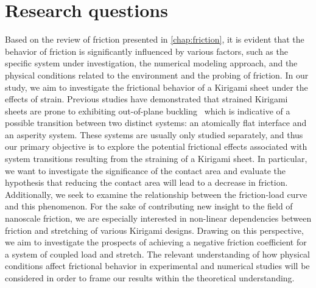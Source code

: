 



\section{Research questions}\label{sec:research_questions}

%
%
%
%
%


Based on the review of friction presented in \cref{chap:friction}, it is evident that the behavior of friction is significantly influenced by various factors, such as the specific system under investigation, the numerical modeling approach, and the physical conditions related to the environment and the probing of friction. In our study, we aim to investigate the frictional behavior
of a Kirigami sheet under the effects of strain. Previous studies have
demonstrated that strained Kirigami sheets are prone to exhibiting out-of-plane buckling~\cite{PhysRevLett.121.255304, PhysRevResearch.2.042006} which is indicative of a possible transition between two distinct systems: an atomically flat interface and an asperity system. These systems are usually only studied
separately, and thus our primary objective is to explore the potential frictional effects associated with system transitions resulting from the straining of a Kirigami sheet. In particular, we want to investigate the significance of the contact area and evaluate the hypothesis that reducing the contact area will lead to a decrease in friction. Additionally, we seek to examine the relationship between the friction-load curve and this phenomenon. For the sake of contributing new insight to the field of nanoscale
friction, we are especially interested in non-linear dependencies between
friction and stretching of various Kirigami designs. Drawing on this
perspective, we aim to investigate the prospects of achieving a negative friction coefficient for a system of coupled load and stretch. The relevant
understanding of how physical conditions affect frictional behavior in
experimental and numerical studies will be considered in order to frame our
results within the theoretical understanding.

